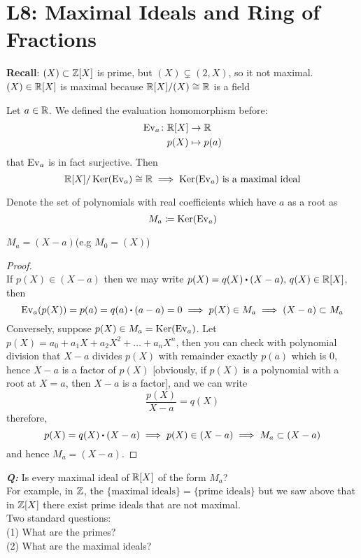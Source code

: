 \documentclass[../Main.tex]{subfiles}
\begin{document}
\chapter{L8: Maximal Ideals and Ring of Fractions}

\textbf{Recall}: $(X) \subset \mathbb{Z}[X]$ is prime, but $(X)\subsetneq (2,X)$, so it not maximal.\\
$(X)\in \mathbb{R}[X]$ is maximal because $\mathbb{R}[X]/(X) \cong \mathbb{R}$ is a field

\begin{example}
	Let $a\in \mathbb{R}$. We defined the evaluation homomorphism before:
	\begin{align*}
	\operatorname{Ev}_a\colon \mathbb{R}[X] &\to \mathbb{R} \\
	p(X) &\mapsto p(a)
	\end{align*}
	\Obs that $\operatorname{Ev}_a$ is in fact surjective. Then
	\[\mathbb{R}[X]/\operatorname{Ker}(\operatorname{Ev}_a) \cong \mathbb{R} \implies \operatorname{Ker}(\operatorname{Ev}_a) \text{ is a maximal ideal}\]
\end{example}
	Denote the set of polynomials with real coefficients which have $a$ as a root as \[M_a\coloneqq \operatorname{Ker}(\operatorname{Ev}_a)\]
	\begin{claim}
		$M_a = (X-a)$\quad (e.g $M_0 =(X)$)
	\end{claim}
	\begin{proof}~\\
		If $p(X) \in (X-a)$ then we may write $p(X)=q(X)\rdot (X-a),\, q(X)\in \R[X]$, then
		\[\ev_a(p(X)) = p(a) = q(a)\rdot (a-a)=0 \implies p(X)\in M_a \implies (X-a) \subset M_a\] 
		Conversely, suppose $p(X) \in M_a = \operatorname{Ker}(\operatorname{Ev}_a)$. Let $p(X) = a_0 + a_1X+a_2X^2+\dots+a_nX^n$, then you can check with polynomial division that $X-a$ divides $p(X)$ with remainder exactly $p(a)$ which is $0$, hence $X-a$ is a factor of $p(X)$ [obviously, if $p(X)$ is a polynomial with a root at $X=a$, then $X-a$ is a factor], and we can write
		\[\frac{p(X)}{X-a} = q(X)\]
		therefore,
		\[p(X)=q(X)\rdot (X-a)\implies p(X) \in (X-a) \implies M_a \subset (X-a) \]
		and hence $M_a =(X-a)$.
	\end{proof}
\textbf{\textit{Q:}} Is every maximal ideal of $\mathbb{R}[X]$ of the form $M_a$?\\
For example, in $\mathbb{Z}$, the $\{\text{maximal ideals}\} =\{\text{prime ideals}\}$ but we saw above that in $\mathbb{Z}[X]$ there exist prime ideals that are not maximal.\\
Two standard questions:\\
(1) What are the primes?\\
(2) What are the maximal ideals?
\end{document}
